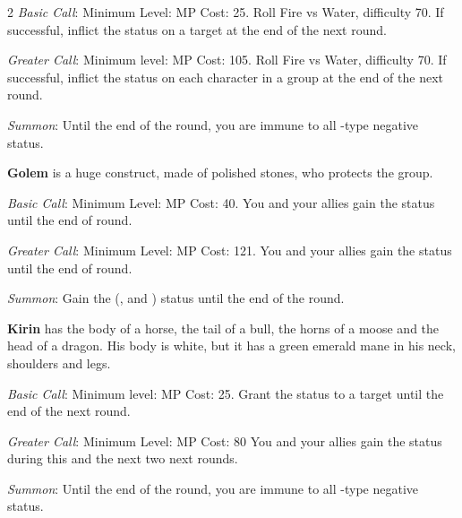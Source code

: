 \begin{multicols}{2}
    \textit{Basic Call}: Minimum Level:  MP Cost: 25. Roll Fire vs Water, difficulty 70. If successful, inflict the  status on a target at the end of the next round.
    
    \textit{Greater Call}: Minimum level:  MP Cost: 105. Roll Fire vs Water, difficulty 70. If successful, inflict the  status on each character in a group at the end of the next round.
    
    \textit{Summon}: Until the end of the round, you are immune to all -type negative status.

    \ffcrystal[type=level,height=8pt]
    
    \textbf{Golem} is a huge construct, made of polished stones, who protects the group.
    
    \textit{Basic Call}: Minimum Level:  MP Cost: 40. You and your allies gain the  status until the end of round.
    
    \textit{Greater Call}: Minimum Level:  MP Cost: 121. You and your allies gain the  status until the end of round.
    
    \textit{Summon}: Gain the  (,  and ) status until the end of the round.

    \ffcrystal[type=level,height=8pt]
    
    \textbf{Kirin} has the body of a horse, the tail of a bull, the horns of a moose and the head of a dragon. His body is white, but it has a green emerald mane in his neck, shoulders and legs.
    
    \textit{Basic Call}: Minimum level:  MP Cost: 25. Grant the  status to a target until the end of the next round.
    
    \textit{Greater Call}: Minimum Level:  MP Cost: 80 You and your allies gain the  status during this and the next two next rounds.
    
    \textit{Summon}: Until the end of the round, you are immune to all -type negative status.

    \ffcrystal[type=level,height=8pt]
    

\end{multicols}
